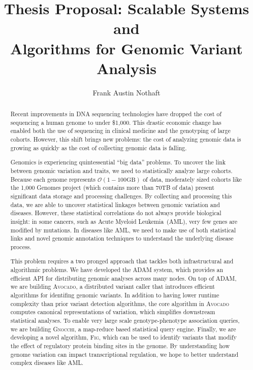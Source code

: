 \documentclass[11pt]{article} %
\begin{document}
\title{Thesis Proposal: Scalable Systems and \\ Algorithms for Genomic Variant Analysis}
\author{Frank Austin Nothaft} 
\date{}

\maketitle

\begin{abstract}

Recent improvements in DNA sequencing technologies have dropped the cost of sequencing a
human genome to under \$1,000. This drastic economic change has enabled both the use of
sequencing in clinical medicine and the genotyping of large cohorts. However, this shift
brings new problems: the cost of analyzing genomic data is growing as quickly as the cost
of collecting genomic data is falling.

Genomics is experiencing quintessential ``big data'' problems. To uncover the link between
genomic variation and traits, we need to statistically analyze large cohorts. Because each
genome represents $\mathcal{O}(1-100\text{GB})$ of data, moderately sized cohorts like the
1,000 Genomes project (which contains more than 70TB of data) present significant data
storage and processing challenges. By collecting and processing this data, we are able to
uncover statistical linkages between genomic variation and diseases. However, these statistical
correlations do not always provide biological insight: in some cancers, such as Acute
Myeloid Leukemia~(AML), very few genes are modified by mutations. In diseases like AML,
we need to make use of both statistical links and novel genomic annotation techniques to
understand the underlying disease process.

This problem requires a two pronged approach that tackles both infrastructural and
algorithmic problems. We have developed the \textsc{ADAM} system, which provides an efficient
API for distributing genomic analyses across many nodes. On top of \textsc{ADAM}, we are
building \textsc{Avocado}, a distributed variant caller that introduces efficient algorithms
for identifing genomic variants. In addition to having lower runtime complexity than prior
variant detection algorithms, the core algorithm in \textsc{Avocado} computes canonical
representations of variation, which simplifies downstream statistical analyses. To enable
very large scale genotype-phenotype association queries, we are building \textsc{Gnocchi},
a map-reduce based statistical query engine. Finally, we are developing a novel algorithm,
\textsc{Fig}, which can be used to identify variants that modify the effect of regulatory
protein binding sites in the genome. By understanding how genome variation can impact
transcriptional regulation, we hope to better understand complex diseases like AML.

\end{abstract}
\end{document}
